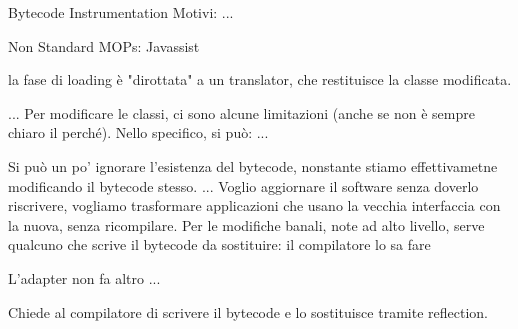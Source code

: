 Bytecode Instrumentation
Motivi: ...



Non Standard MOPs: Javassist


la fase di loading è "dirottata" a un translator, che restituisce la classe modificata.


...
Per modificare le classi, ci sono alcune limitazioni (anche se non è sempre chiaro il perché). Nello specifico, si può:
...

Si può un po' ignorare l'esistenza del bytecode, nonstante stiamo effettivametne modificando il bytecode stesso.
...
Voglio aggiornare il software senza doverlo riscrivere, vogliamo trasformare applicazioni che usano la vecchia interfaccia con la nuova, senza ricompilare.
Per le modifiche banali, note ad alto livello, serve qualcuno che scrive il bytecode da sostituire: il compilatore lo sa fare


L'adapter non fa altro ...

Chiede al compilatore di scrivere il bytecode e lo sostituisce tramite reflection.

